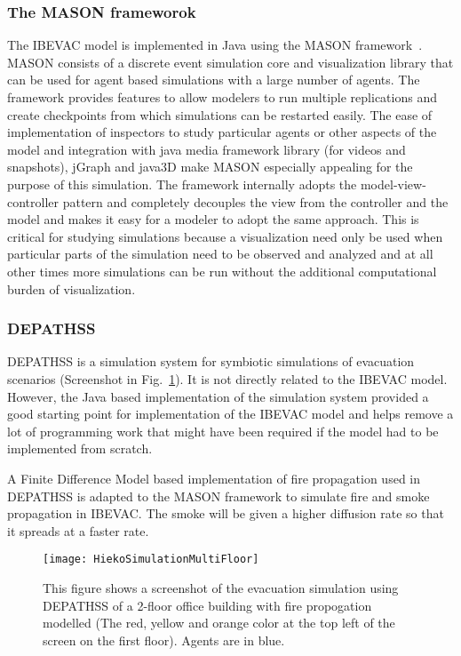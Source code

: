 \subsubsection{The MASON frameworok}
\label{CFW:MASON}
The IBEVAC model is implemented in Java using the MASON framework~\cite{Luke:2005wc}. MASON consists of a discrete event simulation core and visualization library that can be used for agent based simulations with a large number of agents. The framework provides features to allow modelers to run multiple replications and create checkpoints from which simulations can be restarted easily. The ease of implementation of inspectors to study particular agents or other aspects of the model and integration with java media framework library (for videos and snapshots), jGraph and java3D make MASON especially appealing for the purpose of this simulation. The framework internally adopts the model-view-controller pattern and completely decouples the view from the controller and the model and makes it easy for a modeler to adopt the same approach. This is critical for studying simulations because a visualization need only be used when particular parts of the simulation need to be observed and analyzed and at all other times more simulations can be run without the additional computational burden of visualization.



\subsubsection{DEPATHSS}
\label{CFW:Depathss}

DEPATHSS is a simulation system for symbiotic simulations of evacuation scenarios (Screenshot in Fig.~\ref{fig:DEPATHSSScreenShot}). It is not directly related to the IBEVAC model. However, the Java based implementation of the simulation system provided a good starting point for implementation of the IBEVAC model and helps remove a lot of programming work that might have been required if the model had to be implemented from scratch.

A Finite Difference Model based implementation of fire propagation used in DEPATHSS is adapted to the MASON framework to simulate fire and smoke propagation in IBEVAC. The smoke will be given a higher diffusion rate so that it spreads at a faster rate.

\begin{figure}[!tb]
\centering
\texttt{[image: HiekoSimulationMultiFloor]}
\caption[DEPATHSS Screenshot]{This figure shows a screenshot of the evacuation simulation using DEPATHSS of a 2-floor office building with fire propogation modelled (The red, yellow and orange color at the top left of the screen on the first floor). Agents are in blue.}
\label{fig:DEPATHSSScreenShot}
\end{figure}


